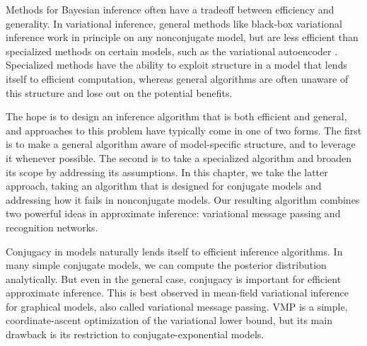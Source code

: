 Methods for Bayesian inference
often have a tradeoff between
efficiency and generality.
In variational inference,
general methods like black-box variational inference \citep{Ranganath2014}
work in principle on any nonconjugate model,
but are less efficient
than specialized methods on certain models,
such as the variational autoencoder \citep[VAE; ][]{Kingma2014, Rezende2014}. 
Specialized
methods have the ability to
exploit structure in a model
that lends itself to efficient computation,
whereas general algorithms are often
unaware of this structure and lose out on the potential 
benefits.

The hope is to design an inference algorithm
that is both efficient and general,
and approaches to this problem have typically come in one of two forms.
The first is to make a general algorithm
aware of model-specific structure,
and to leverage it whenever possible.
The second is to take a specialized
algorithm and broaden its scope
by addressing its assumptions.
In this chapter, we take the latter approach,
taking an algorithm
that is designed for conjugate models
and addressing how it fails in nonconjugate models.
Our resulting algorithm combines two powerful ideas 
in approximate inference: variational message
passing \citep[VMP; ][]{Winn2005} and recognition networks.


Conjugacy in models naturally lends itself
to efficient inference algorithms.
In many simple conjugate models,
we can compute the posterior distribution analytically.
But even in the general case, conjugacy is important
for efficient approximate inference.
This is best observed in mean-field variational inference
for graphical models, also called variational message passing.
VMP is a simple, coordinate-ascent optimization of the
variational lower bound,
but its main drawback is its restriction
to conjugate-exponential models.

